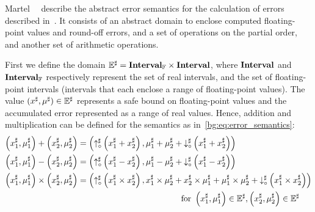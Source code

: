 Martel~\etal~\cite{martel07, ioualalen} describe the abstract error semantics
for the calculation of errors described in~\cite{ioualalen, martel07}.  It
consists of an abstract domain to enclose computed floating-point values and
round-off errors, and a set of operations on the partial order, and another set
of arithmetic operations.

First we define the domain $\mathbb{E}^\sharp = \mathbf{Interval}_\mathbb{F}\times\mathbf{Interval}$,
where $\mathbf{Interval}$ and $\mathbf{Interval}_\mathbb{F}$ respectively represent the
set of real intervals, and the set of floating-point intervals (intervals
that each enclose a range of floating-point values).  The value $(x^\sharp,
\mu^\sharp) \in \mathbb{E}^\sharp$ represents a safe bound on floating-point
values and the accumulated error represented as a range of real values.
Hence, addition and multiplication can be defined for the semantics as
in~\eqref{bg:eq:error_semantics}:
\begin{equation}
    \begin{aligned}
        \left( x^\sharp_1, \mu^\sharp_1 \right) +
        \left( x^\sharp_2, \mu^\sharp_2 \right)
    &=  \left(
            \operatorname{\uparrow^\sharp_\circ}\left(x^\sharp_1 + x^\sharp_2\right),
            \mu^\sharp_1 + \mu^\sharp_2 +
            \operatorname{\downarrow^\sharp_\circ}\left(x^\sharp_1 + x^\sharp_2\right)
        \right) \\
        \left( x^\sharp_1, \mu^\sharp_1 \right) -
        \left( x^\sharp_2, \mu^\sharp_2 \right)
    &=  \left(
            \operatorname{\uparrow^\sharp_\circ}\left(x^\sharp_1 - x^\sharp_2\right),
            \mu^\sharp_1 - \mu^\sharp_2 +
            \operatorname{\downarrow^\sharp_\circ}\left(x^\sharp_1 - x^\sharp_2\right)
        \right) \\
        \left( x^\sharp_1, \mu^\sharp_1 \right) \times
        \left( x^\sharp_2, \mu^\sharp_2 \right)
    &=  \left(
            \operatorname{\uparrow^\sharp_\circ}\left(x^\sharp_1 \times x^\sharp_2\right),
            x^\sharp_1 \times \mu^\sharp_2 + x^\sharp_2 \times \mu^\sharp_1 +
            \mu^\sharp_1 \times \mu^\sharp_2 +
            \operatorname{\downarrow^\sharp_\circ}\left(x^\sharp_1 \times x^\sharp_2\right)
        \right) \\
    &\qquad\qquad\qquad\qquad\qquad\qquad\text{~for~}
        \left( x^\sharp_1, \mu^\sharp_1 \right) \in \mathbb{E}^\sharp,
        \left( x^\sharp_2, \mu^\sharp_2 \right) \in \mathbb{E}^\sharp
    \end{aligned}
    \label{bg:eq:error_semantics}
\end{equation}


